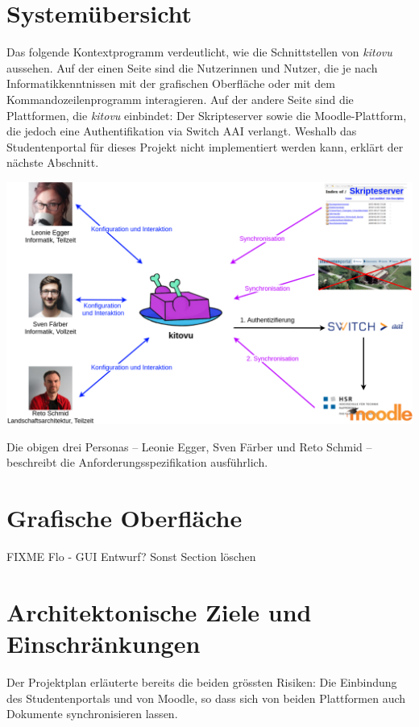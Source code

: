 \documentclass[a4paper]{article}
\let\oldsection\section
\renewcommand\section{\clearpage\oldsection}
\begin{document}
\section{Systemübersicht}

Das folgende Kontextprogramm verdeutlicht, wie die Schnittstellen von \emph{kitovu} aussehen. Auf der einen Seite  sind die Nutzerinnen und Nutzer, die je nach Informatikkenntnissen mit der grafischen Oberfläche oder mit dem Kommandozeilenprogramm interagieren. Auf der andere Seite sind die Plattformen, die \emph{kitovu} einbindet: Der Skripteserver sowie die Moodle-Plattform, die jedoch eine Authentifikation via Switch AAI verlangt. Weshalb das Studentenportal für dieses Projekt nicht implementiert werden kann, erklärt der nächste Abschnitt.

\includegraphics[width=40em]{./img/kontextdiagramm.png}

Die obigen drei Personas -- Leonie Egger, Sven Färber und Reto Schmid -- beschreibt die Anforderungsspezifikation ausführlich.

\section{Grafische Oberfläche}

FIXME Flo - GUI Entwurf? Sonst Section löschen

\section{Architektonische Ziele und Einschränkungen}

Der Projektplan erläuterte bereits die beiden grössten Risiken: Die Einbindung des Studentenportals und von Moodle, so dass sich von beiden Plattformen auch Dokumente synchronisieren lassen.
\end{document}
